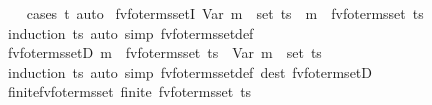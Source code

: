 \begin{isabellebody}
%
\isadelimproof
\ \ %
\endisadelimproof
%
\isatagproof
{}\isamarkupfalse%
\ {\isacharparenleft}{\kern0pt}cases\ t{\isacharparenright}{\kern0pt}\ auto%
\endisatagproof
{\isafoldproof}%
%
\isadelimproof
\isanewline
%
\endisadelimproof
\isanewline
{}\isamarkupfalse%
\ fv{\isacharunderscore}{\kern0pt}fo{\isacharunderscore}{\kern0pt}terms{\isacharunderscore}{\kern0pt}setI{\isacharcolon}{\kern0pt}\ {\isachardoublequoteopen}Var\ m\ {\isasymin}\ set\ ts\ {\isasymLongrightarrow}\ m\ {\isasymin}\ fv{\isacharunderscore}{\kern0pt}fo{\isacharunderscore}{\kern0pt}terms{\isacharunderscore}{\kern0pt}set\ ts{\isachardoublequoteclose}\isanewline
%
\isadelimproof
\ \ %
\endisadelimproof
%
\isatagproof
{}\isamarkupfalse%
\ {\isacharparenleft}{\kern0pt}induction\ ts{\isacharparenright}{\kern0pt}\ {\isacharparenleft}{\kern0pt}auto\ simp{\isacharcolon}{\kern0pt}\ fv{\isacharunderscore}{\kern0pt}fo{\isacharunderscore}{\kern0pt}terms{\isacharunderscore}{\kern0pt}set{\isacharunderscore}{\kern0pt}def{\isacharparenright}{\kern0pt}%
\endisatagproof
{\isafoldproof}%
%
\isadelimproof
\isanewline
%
\endisadelimproof
\isanewline
{}\isamarkupfalse%
\ fv{\isacharunderscore}{\kern0pt}fo{\isacharunderscore}{\kern0pt}terms{\isacharunderscore}{\kern0pt}setD{\isacharcolon}{\kern0pt}\ {\isachardoublequoteopen}m\ {\isasymin}\ fv{\isacharunderscore}{\kern0pt}fo{\isacharunderscore}{\kern0pt}terms{\isacharunderscore}{\kern0pt}set\ ts\ {\isasymLongrightarrow}\ Var\ m\ {\isasymin}\ set\ ts{\isachardoublequoteclose}\isanewline
%
\isadelimproof
\ \ %
\endisadelimproof
%
\isatagproof
{}\isamarkupfalse%
\ {\isacharparenleft}{\kern0pt}induction\ ts{\isacharparenright}{\kern0pt}\ {\isacharparenleft}{\kern0pt}auto\ simp{\isacharcolon}{\kern0pt}\ fv{\isacharunderscore}{\kern0pt}fo{\isacharunderscore}{\kern0pt}terms{\isacharunderscore}{\kern0pt}set{\isacharunderscore}{\kern0pt}def\ dest{\isacharcolon}{\kern0pt}\ fv{\isacharunderscore}{\kern0pt}fo{\isacharunderscore}{\kern0pt}term{\isacharunderscore}{\kern0pt}setD{\isacharparenright}{\kern0pt}%
\endisatagproof
{\isafoldproof}%
%
\isadelimproof
\isanewline
%
\endisadelimproof
\isanewline
{}\isamarkupfalse%
\ finite{\isacharunderscore}{\kern0pt}fv{\isacharunderscore}{\kern0pt}fo{\isacharunderscore}{\kern0pt}terms{\isacharunderscore}{\kern0pt}set{\isacharcolon}{\kern0pt}\ {\isachardoublequoteopen}finite\ {\isacharparenleft}{\kern0pt}fv{\isacharunderscore}{\kern0pt}fo{\isacharunderscore}{\kern0pt}terms{\isacharunderscore}{\kern0pt}set\ ts{\isacharparenright}{\kern0pt}{\isachardoublequoteclose}\isanewline

\end{isabellebody}
